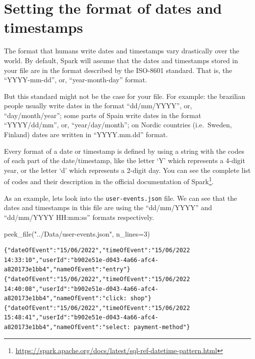 \documentclass[
  11pt,
  letterpaper,
  DIV=11,
  numbers=noendperiod]{scrreprt}
\newenvironment{Shaded}{\begin{snugshade}}{\end{snugshade}}
\newcommand{\DecValTok}[1]{\textcolor[rgb]{0.68,0.00,0.00}{#1}}
\newcommand{\NormalTok}[1]{\textcolor[rgb]{0.00,0.23,0.31}{#1}}
\newcommand{\OperatorTok}[1]{\textcolor[rgb]{0.37,0.37,0.37}{#1}}
\newcommand{\StringTok}[1]{\textcolor[rgb]{0.13,0.47,0.30}{#1}}
\begin{document}
\hypertarget{setting-the-format-of-dates-and-timestamps}{%
\section{Setting the format of dates and
timestamps}\label{setting-the-format-of-dates-and-timestamps}}

The format that humans write dates and timestamps vary drastically over
the world. By default, Spark will assume that the dates and timestamps
stored in your file are in the format described by the ISO-8601
standard. That is, the ``YYYY-mm-dd'', or, ``year-month-day'' format.

But this standard might not be the case for your file. For example: the
brazilian people usually write dates in the format ``dd/mm/YYYY'', or,
``day/month/year''; some parts of Spain write dates in the format
``YYYY/dd/mm'', or, ``year/day/month''; on Nordic countries
(i.e.~Sweden, Finland) dates are written in ``YYYY.mm.dd'' format.

Every format of a date or timestamp is defined by using a string with
the codes of each part of the date/timestamp, like the letter `Y' which
represents a 4-digit year, or the letter `d' which represents a 2-digit
day. You can see the complete list of codes and their description in the
official documentation of Spark\footnote{\url{https://spark.apache.org/docs/latest/sql-ref-datetime-pattern.html}}.

As an example, lets look into the \texttt{user-events.json} file. We can
see that the dates and timestamps in this file are using the
``dd/mm/YYYY'' and ``dd/mm/YYYY HH:mm:ss'' formats respectively.

\begin{Shaded}
\begin{Highlighting}[]
\NormalTok{peek\_file(}\StringTok{"../Data/user{-}events.json"}\NormalTok{, n\_lines}\OperatorTok{=}\DecValTok{3}\NormalTok{)}
\end{Highlighting}
\end{Shaded}

\begin{verbatim}
{"dateOfEvent":"15/06/2022","timeOfEvent":"15/06/2022 14:33:10","userId":"b902e51e-d043-4a66-afc4-a820173e1bb4","nameOfEvent":"entry"}
{"dateOfEvent":"15/06/2022","timeOfEvent":"15/06/2022 14:40:08","userId":"b902e51e-d043-4a66-afc4-a820173e1bb4","nameOfEvent":"click: shop"}
{"dateOfEvent":"15/06/2022","timeOfEvent":"15/06/2022 15:48:41","userId":"b902e51e-d043-4a66-afc4-a820173e1bb4","nameOfEvent":"select: payment-method"}
\end{verbatim}
\end{document}
